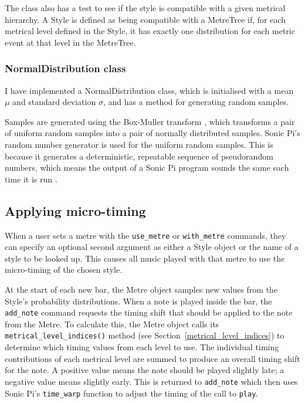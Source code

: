 \documentclass[12pt,twoside,openright]{report}
\begin{document}
The class also has a test to see if the style is compatible with a given metrical
hierarchy. A Style is defined as being compatible with a MetreTree if, for each
metrical level defined in the Style, it has exactly one distribution for each
metric event at that level in the MetreTree.

\subsubsection{NormalDistribution class} \label{normal_distribution}

I have implemented a NormalDistribution class, which is initialised with a mean $\mu$ and standard deviation
$\sigma$, and has a method for generating random samples.

Samples are generated using the
Box-Muller transform \cite{box1958}, which transforms a pair of uniform random
samples into a pair of normally distributed samples. Sonic Pi's random number
generator is used for the uniform random samples. This is because it generates a
deterministic, repeatable sequence of pseudorandom numbers, which means the output of
a Sonic Pi program sounds the same each time it is run \cite{aaron2016}.


\subsection{Applying micro-timing} \label{applying_micro-timing}

When a user sets a metre with the \verb'use_metre' or \verb'with_metre' commands, they can
specify an optional second argument as either a Style object or the name of a
style to be looked up. This causes all music played with that metre to use the
micro-timing of the chosen style.

At the start of each new bar, the Metre object samples new values from the
Style's probability distributions. When a note is played inside the bar, the
\verb'add_note' command requests the timing shift that should be applied to the note
from the Metre. To calculate this, the Metre object calls its
\verb'metrical_level_indices()' method (see Section~\ref{metrical_level_indices}) to determine which timing
values from each level to use. The individual timing contributions of each
metrical level are summed to produce an overall timing shift for the
note. A positive value means the note should be played slightly late; a negative
value means slightly early. This is returned to \verb'add_note' which then uses Sonic Pi's \verb'time_warp' function to adjust the timing of the call to \verb'play'.
\end{document}
